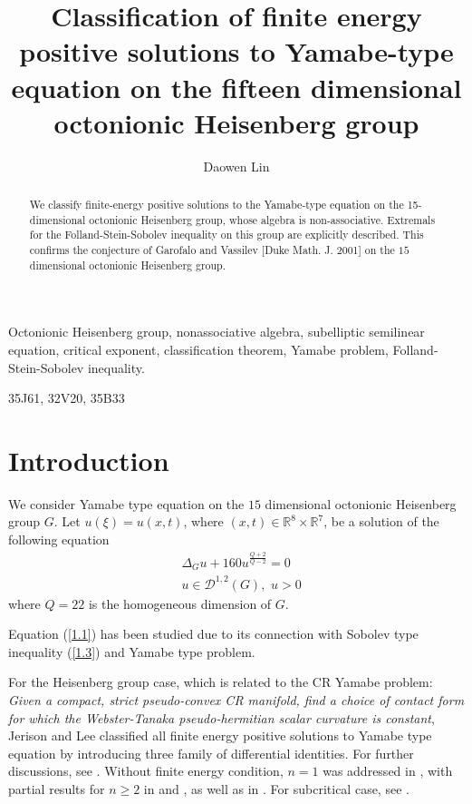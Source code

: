 \documentclass[reqno,12pt]{amsart}
\title[Classification on 15 dimensional octonionic Heisenberg group]{Classification of finite energy positive solutions to Yamabe-type equation on the fifteen dimensional octonionic Heisenberg  group}
\author[]{Daowen Lin}
\numberwithin{equation}{section}
\theoremstyle{plain}
\theoremstyle{definition}
\begin{document}
\begin{abstract}
  We classify finite-energy positive solutions to the Yamabe-type equation on the 15-dimensional octonionic Heisenberg group, whose algebra is non-associative. Extremals for the Folland-Stein-Sobolev inequality on this group are explicitly described. This confirms the conjecture of Garofalo and Vassilev [Duke Math. J. 2001] on the $15$ dimensional octonionic Heisenberg group.
\end{abstract}
\maketitle



\begin{center}

 Octonionic Heisenberg group, nonassociative algebra, subelliptic semilinear equation, critical exponent, classification  theorem,  Yamabe problem, Folland-Stein-Sobolev inequality. 

\bigskip

 35J61, 32V20, 35B33

\end{center}

\section{Introduction}


We consider  Yamabe type equation on the $15$ dimensional octonionic Heisenberg group $G$. 
Let $u(\xi)=u(x,t)$, where $(x,t)\in \mathbb{R}^{8}\times \mathbb{R}^{7}$, be a solution of the following equation 
\begin{equation}\label{1.1}
    \begin{aligned}
        &\Delta_G u+160u^\frac{Q+2}{Q-2}=0\\& u\in \mathscr{D}^{1,2}(G),\,\,u> 0   
    \end{aligned}
\end{equation}
where $Q=22$ is the homogeneous dimension of $G$. 

Equation (\ref{1.1}) has been studied due to its  connection with  Sobolev type inequality (\ref{1.3}) and   Yamabe type problem.

For the Heisenberg group case, which is related to the CR Yamabe problem: \textit{Given a compact, strict pseudo-convex CR manifold, find a choice of contact form for which the Webster-Tanaka pseudo-hermitian scalar curvature is constant}, Jerison and Lee \cite{JL1988} classified all finite energy positive solutions to  Yamabe type equation by introducing three family of differential identities. For further discussions,  see \cite{G2001a} \cite{G2001b} \cite{JL1987} \cite{JL1989} \cite{W2015}. Without finite energy condition, $n=1$ was addressed in \cite{CLMR2023}, with partial results for $n\geq 2$ in \cite{CLMR2023} and \cite{FV2023}, as well as in \cite{CMRW2024}. For subcritical case, see \cite{MO2023} \cite{MOW2023}. 
\end{document}
